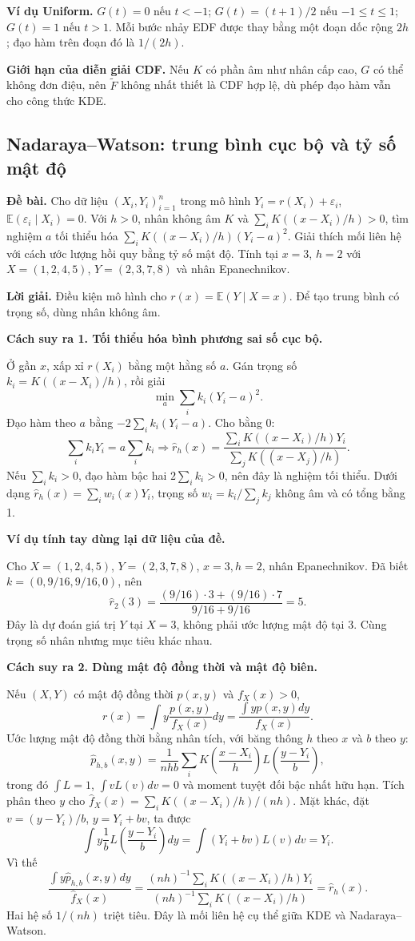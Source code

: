 \documentclass[11pt,a4paper]{article}
\newcommand{\E}{\mathbb E}
\newcommand{\buoc}[1]{\par\medskip\textbf{#1}\par}
\begin{document}
\textbf{Ví dụ Uniform.} $G(t)=0$ nếu $t<-1$; $G(t)=(t+1)/2$ nếu $-1\leq t\leq1$; $G(t)=1$ nếu $t>1$. Mỗi bước nhảy EDF được thay bằng một đoạn dốc rộng $2h$; đạo hàm trên đoạn đó là $1/(2h)$.

\textbf{Giới hạn của diễn giải CDF.} Nếu $K$ có phần âm như nhân cấp cao, $G$ có thể không đơn điệu, nên $\widetilde F$ không nhất thiết là CDF hợp lệ, dù phép đạo hàm vẫn cho công thức KDE.

\subsection{Nadaraya--Watson: trung bình cục bộ và tỷ số mật độ}\label{sec:nw}
\textbf{Đề bài.} Cho dữ liệu $(X_i,Y_i)_{i=1}^n$ trong mô hình
$Y_i=r(X_i)+\varepsilon_i$, $\E(\varepsilon_i\mid X_i)=0$.
Với $h>0$, nhân không âm $K$ và $\sum_iK((x-X_i)/h)>0$,
tìm nghiệm $a$ tối thiểu hóa $\sum_iK((x-X_i)/h)(Y_i-a)^2$.
Giải thích mối liên hệ với cách ước lượng hồi quy bằng tỷ số mật độ.
Tính tại $x=3$, $h=2$ với $X=(1,2,4,5)$, $Y=(2,3,7,8)$ và nhân Epanechnikov.

\textbf{Lời giải.} Điều kiện mô hình cho $r(x)=\E(Y\mid X=x)$.
Để tạo trung bình có trọng số, dùng nhân không âm.

\buoc{Cách suy ra 1. Tối thiểu hóa bình phương sai số cục bộ.}
Ở gần $x$, xấp xỉ $r(X_i)$ bằng một hằng số $a$. Gán trọng số $k_i=K((x-X_i)/h)$, rồi giải
\[
\min_a\sum_i k_i(Y_i-a)^2.
\]
Đạo hàm theo $a$ bằng $-2\sum_i k_i(Y_i-a)$. Cho bằng 0:
\[
\sum_i k_iY_i=a\sum_i k_i
\Longrightarrow
\boxed{\widehat r_h(x)=\frac{\sum_iK((x-X_i)/h)Y_i}{\sum_jK((x-X_j)/h)}}.
\]
Nếu $\sum_i k_i>0$, đạo hàm bậc hai $2\sum_i k_i>0$, nên đây là nghiệm tối thiểu. Dưới dạng $\widehat r_h(x)=\sum_iw_i(x)Y_i$, trọng số $w_i=k_i/\sum_jk_j$ không âm và có tổng bằng 1.

\buoc{Ví dụ tính tay dùng lại dữ liệu của đề.}
Cho $X=(1,2,4,5)$, $Y=(2,3,7,8)$, $x=3,h=2$, nhân Epanechnikov. Đã biết $k=(0,9/16,9/16,0)$, nên
\[
\widehat r_2(3)=\frac{(9/16)\cdot3+(9/16)\cdot7}{9/16+9/16}
=\boxed{5}.
\]
Đây là dự đoán giá trị $Y$ tại $X=3$, không phải ước lượng mật độ tại 3. Cùng trọng số nhân nhưng mục tiêu khác nhau.

\buoc{Cách suy ra 2. Dùng mật độ đồng thời và mật độ biên.}
Nếu $(X,Y)$ có mật độ đồng thời $p(x,y)$ và $f_X(x)>0$,
\[
r(x)=\int y\frac{p(x,y)}{f_X(x)}dy
=\frac{\int yp(x,y)dy}{f_X(x)}.
\]
Ước lượng mật độ đồng thời bằng nhân tích, với băng thông $h$ theo $x$ và $b$ theo $y$:
\[
\widehat p_{h,b}(x,y)=\frac1{nhb}\sum_iK\!\left(\frac{x-X_i}{h}\right)L\!\left(\frac{y-Y_i}{b}\right),
\]
trong đó $\int L=1$, $\int vL(v)dv=0$ và moment tuyệt đối bậc nhất hữu hạn.
Tích phân theo $y$ cho $\widehat f_X(x)=\sum_iK((x-X_i)/h)/(nh)$.
Mặt khác, đặt $v=(y-Y_i)/b$, $y=Y_i+bv$, ta được
\[
\int y\frac1bL\!\left(\frac{y-Y_i}{b}\right)dy
=\int(Y_i+bv)L(v)dv=Y_i.
\]
Vì thế
\[
\frac{\int y\widehat p_{h,b}(x,y)dy}{\widehat f_X(x)}
=\frac{(nh)^{-1}\sum_iK((x-X_i)/h)Y_i}{(nh)^{-1}\sum_iK((x-X_i)/h)}
=\widehat r_h(x).
\]
Hai hệ số $1/(nh)$ triệt tiêu. Đây là mối liên hệ cụ thể giữa KDE và Nadaraya--Watson.
\end{document}
